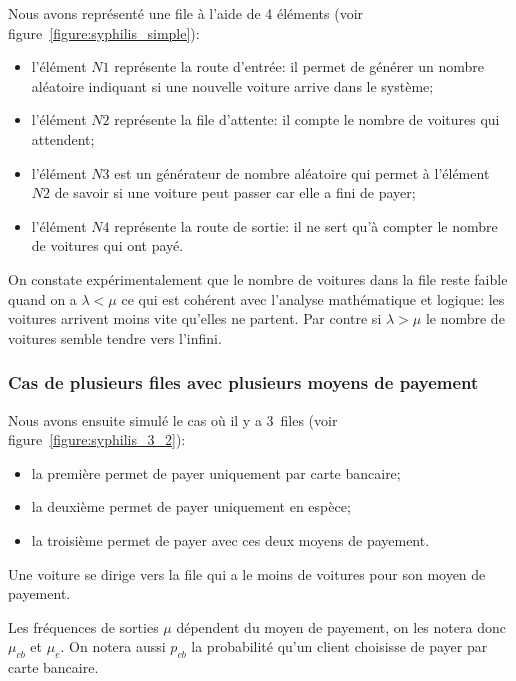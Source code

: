 \documentclass{scrartcl}
\begin{document}
      Nous avons représenté une file à l'aide de 4 éléments (voir
      figure~\ref{figure:syphilis_simple}):
      \begin{itemize}
        \item l'élément $N1$ représente la route d'entrée: il permet de générer
          un nombre aléatoire indiquant si une nouvelle voiture arrive dans le
          système;
        \item l'élément $N2$ représente la file d'attente: il compte le nombre
          de voitures qui attendent;
        \item l'élément $N3$ est un générateur de nombre aléatoire qui permet à
          l'élément $N2$ de savoir si une voiture peut passer car elle a fini
          de payer;
        \item l'élément $N4$ représente la route de sortie: il ne sert qu'à
          compter le nombre de voitures qui ont payé.
      \end{itemize}

      On constate expérimentalement que le nombre de voitures dans la file
      reste faible quand on a $\lambda < \mu$ ce qui est cohérent avec
      l'analyse mathématique et logique: les voitures arrivent moins vite
      qu'elles ne partent. Par contre si $\lambda > \mu$ le nombre de voitures
      semble tendre vers l'infini.

    \subsubsection{Cas de plusieurs files avec plusieurs moyens de payement}
      \label{sec:peage_anal}
      Nous avons ensuite simulé le cas où il y a 3~files (voir
      figure~\ref{figure:syphilis_3_2}):
      \begin{itemize}
        \item la première permet de payer uniquement par carte bancaire;
        \item la deuxième permet de payer uniquement en espèce;
        \item la troisième permet de payer avec ces deux moyens de payement.
      \end{itemize}

      Une voiture se dirige vers la file qui a le moins de voitures pour son
      moyen de payement.

      Les fréquences de sorties $\mu$ dépendent du moyen de payement, on les
      notera donc $\mu_{cb}$ et $\mu_e$. On notera aussi $p_{cb}$ la
      probabilité qu'un client choisisse de payer par carte bancaire.
\end{document}
